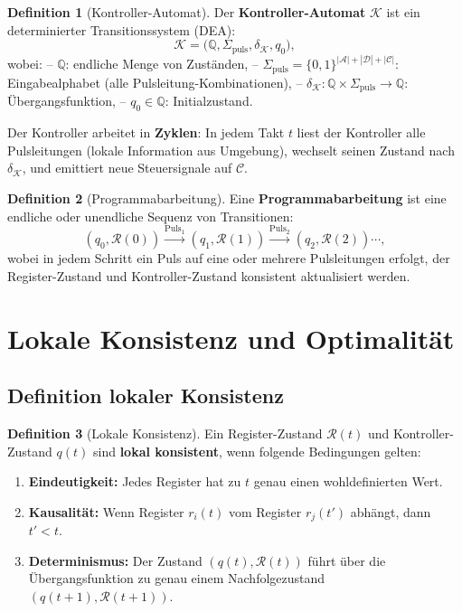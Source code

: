 \documentclass[a4paper,12pt]{article}
\theoremstyle{definition}
\newtheorem{definition}{Definition}
\begin{document}
	\begin{definition}[Kontroller-Automat]
		Der \textbf{Kontroller-Automat} $\mathcal{K}$ ist ein determinierter Transitionssystem (DEA):
		\[
		\mathcal{K} = \bigl(\mathbb{Q}, \Sigma_{\text{puls}}, \delta_{\mathcal{K}}, q_0\bigr),
		\]
		wobei:
		-- $\mathbb{Q}$: endliche Menge von Zuständen,
		-- $\Sigma_{\text{puls}} = \{0, 1\}^{|\mathcal{A}| + |\mathcal{D}| + |\mathcal{C}|}$: Eingabealphabet (alle Pulsleitung-Kombinationen),
		-- $\delta_{\mathcal{K}} : \mathbb{Q} \times \Sigma_{\text{puls}} \to \mathbb{Q}$: Übergangsfunktion,
		-- $q_0 \in \mathbb{Q}$: Initialzustand.
		
		Der Kontroller arbeitet in \textbf{Zyklen}: In jedem Takt $t$ liest der Kontroller alle Pulsleitungen (lokale Information aus Umgebung), wechselt seinen Zustand nach $\delta_{\mathcal{K}}$, und emittiert neue Steuersignale auf $\mathcal{C}$.
	\end{definition}
	
	\begin{definition}[Programmabarbeitung]
		Eine \textbf{Programmabarbeitung} ist eine endliche oder unendliche Sequenz von Transitionen:
		\[
		(q_0, \mathcal{R}(0)) \xrightarrow{\text{Puls}_{1}} (q_1, \mathcal{R}(1)) \xrightarrow{\text{Puls}_{2}} (q_2, \mathcal{R}(2)) \cdots,
		\]
		wobei in jedem Schritt ein Puls auf eine oder mehrere Pulsleitungen erfolgt, der Register-Zustand und Kontroller-Zustand konsistent aktualisiert werden.
	\end{definition}
	
	\section{Lokale Konsistenz und Optimalität}
	\label{sec:lokale_konsistenz}
	
	\subsection{Definition lokaler Konsistenz}
	
	\begin{definition}[Lokale Konsistenz]
		\label{def:lokale_konsistenz}
		Ein Register-Zustand $\mathcal{R}(t)$ und Kontroller-Zustand $q(t)$ sind \textbf{lokal konsistent}, wenn folgende Bedingungen gelten:
		\begin{enumerate}
			\item \textbf{Eindeutigkeit:} Jedes Register hat zu $t$ genau einen wohldefinierten Wert.
			\item \textbf{Kausalität:} Wenn Register $r_i(t)$ vom Register $r_j(t')$ abhängt, dann $t' < t$.
			\item \textbf{Determinismus:} Der Zustand $(q(t), \mathcal{R}(t))$ führt über die Übergangsfunktion zu genau einem Nachfolgezustand $(q(t+1), \mathcal{R}(t+1))$.
		\end{enumerate}
	\end{definition}
	
\end{document}

